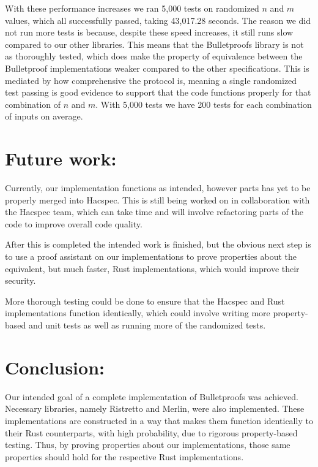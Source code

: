 \documentclass{article}
\begin{document}
With these performance increases we ran 5,000 tests on randomized
$n$ and $m$ values, which all successfully passed, taking 43,017.28
seconds. The reason we did not run more tests is because, despite
these speed increases, it still runs slow compared to our other
libraries. This means that the Bulletproofs library is not as
thoroughly tested, which does make the property of equivalence
between the Bulletproof implementations weaker compared to the other
specifications. This is mediated by how comprehensive the protocol
is, meaning a single randomized test passing is good evidence to
support that the code functions properly for that combination of $n$
and $m$. With 5,000 tests we have 200 tests for each combination of
inputs on average.

\section{Future work:} \label{future-work}

Currently, our implementation functions as intended, however parts has
yet to be properly merged into Hacspec. This is still being worked on in
collaboration with the Hacspec team, which can take time and will
involve refactoring parts of the code to improve overall code quality.

After this is completed the intended work is finished, but the obvious
next step is to use a proof assistant on our implementations to
prove properties about the equivalent, but much faster, Rust
implementations, which would improve their security.

More thorough testing could be done to ensure that the Hacspec and
Rust implementations function identically, which could involve writing
more property-based and unit tests as well as running more of the
randomized tests.

\section{Conclusion:} \label{conclusions}

Our intended goal of a complete implementation of Bulletproofs was
achieved. Necessary libraries, namely Ristretto and Merlin, were also
implemented. These implementations are constructed in a way that
makes them function identically to their Rust counterparts, with high
probability, due to rigorous property-based testing. Thus, by proving
properties about our implementations, those same properties should hold
for the respective Rust implementations.
\end{document}
